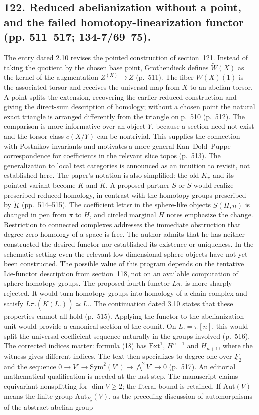 \documentclass[10pt,oneside]{book}
\begin{document}
\subsection*{122. Reduced abelianization without a point, and the failed homotopy-linearization functor (pp. 511--517; 134-7/69--75).}
The entry dated 2.10 revises the pointed construction of section~121. Instead of taking the quotient by the chosen base point, Grothendieck defines $\widetilde W(X)$ as the kernel of the augmentation $\underline Z^{(X)}\to\underline Z$ (p.~511). The fiber $W(X)(1)$ is the associated torsor and receives the universal map from $X$ to an abelian torsor. A point splits the extension, recovering the earlier reduced construction and giving the direct-sum description of homology; without a chosen point the natural exact triangle is arranged differently from the triangle on p.~510 (p.~512). The comparison is more informative over an object $Y$, because a section need not exist and the torsor class $c(X/Y)$ can be nontrivial. This supplies the connection with Postnikov invariants and motivates a more general Kan--Dold--Puppe correspondence for coefficients in the relevant slice topos (p.~513). The generalization to local test categories is announced as an intuition to revisit, not established here. The paper's notation is also simplified: the old $K_\pi$ and its pointed variant become $K$ and $\widetilde K$. A proposed partner $S$ or $\widetilde S$ would realize prescribed reduced homology, in contrast with the homotopy groups prescribed by $\widetilde K$ (pp.~514--515). The coefficient letter in the sphere-like objects $S(H,n)$ is changed in pen from $\pi$ to $H$, and circled marginal $H$ notes emphasize the change. Restriction to connected complexes addresses the immediate obstruction that degree-zero homology of a space is free. The author admits that he has neither constructed the desired functor nor established its existence or uniqueness. In the schematic setting even the relevant low-dimensional sphere objects have not yet been constructed. The possible value of this program depends on the tentative Lie-functor description from section~118, not on an available computation of sphere homotopy groups. The proposed fourth functor $L\pi.$ is more sharply rejected. It would turn homotopy groups into homology of a chain complex and satisfy $L\pi.(\widetilde K(L.))\simeq L.$. The continuation dated 3.10 states that these properties cannot all hold (p.~515). Applying the functor to the abelianization unit would provide a canonical section of the counit. On $L.=\pi[n]$, this would split the universal-coefficient sequence naturally in the groups involved (p.~516). The corrected indices matter: formula (18) has $\mathrm{Ext}^1$, $H^{n+1}$ and $H_{n+1}$, where the witness gives different indices. The text then specializes to degree one over $\underline F_2$ and the sequence $0\to V'\to\mathrm{Sym}^2(V')\to\bigwedge^2V'\to0$ (p.~517). An editorial mathematical qualification is needed at the last step. The manuscript claims equivariant nonsplitting for $\dim V\geq2$; the literal bound is retained. If $\mathrm{Aut}(V)$ means the finite group $\mathrm{Aut}_{\underline F_2}(V)$, as the preceding discussion of automorphisms of the abstract abelian group 
\end{document}
